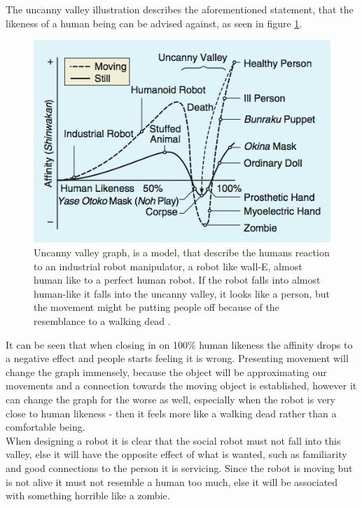 The uncanny valley illustration describes the aforementioned statement, that the likeness of a human being can be advised against, as seen in figure \ref{fig:uncanny}.

\begin{figure}[H]
    \centering
    \includegraphics[width=.75\textwidth]{figures/uncannyvalley.png}
    \caption{Uncanny valley graph, is a model, that describe the humans reaction to an industrial robot manipulator, a robot like wall-E, almost human like to a perfect human robot. If the robot falls into almost human-like it falls into the uncanny valley, it looks like a person, but the movement might be putting people off because of the resemblance to a walking dead 
    \cite{mori2012uncanny}.}
    \label{fig:uncanny}
\end{figure}

It can be seen that when closing in on 100\% human likeness the affinity drops to a negative effect and people starts feeling it is wrong. 
Presenting movement will change the graph immensely, because the object will be approximating our movements and a connection towards the moving object is established, however it can change the graph for the worse as well, especially when the robot is very close to human likeness - then it feels more like a walking dead rather than a comfortable being.\\
When designing a robot it is clear that the social robot must not fall into this valley, else it will have the opposite effect of what is wanted, such as familiarity and good connections to the person it is servicing.
Since the robot is moving but is not alive it must not resemble a human too much, else it will be associated with something horrible like a zombie.\\